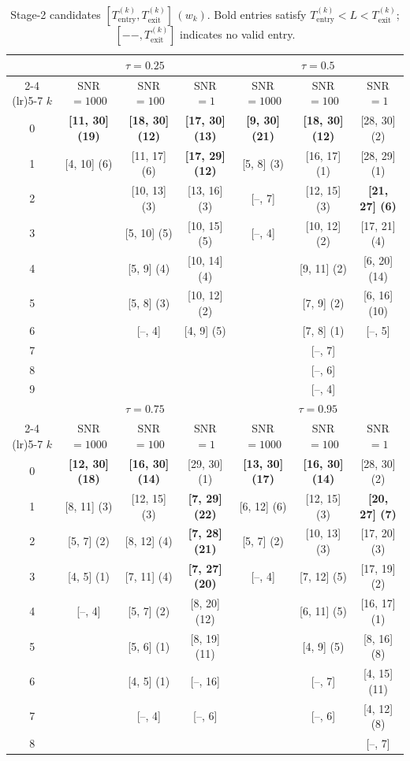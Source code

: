 \begin{table}[htbp]
\centering
\setlength{\tabcolsep}{5pt}
\renewcommand{\arraystretch}{1.15}
\caption{Stage-2 candidates $[T_{\mathrm{entry}}^{(k)}, T_{\mathrm{exit}}^{(k)}]\,(w_k)$. Bold entries satisfy $T_{\mathrm{entry}}^{(k)} < L < T_{\mathrm{exit}}^{(k)}$; $[--, T_{\mathrm{exit}}^{(k)}]$ indicates no valid entry.}
\label{tab:simulation_all_candidates}
\begin{tabular}{ccccccc}
\toprule
 & \multicolumn{3}{c}{$\tau = 0.25$} & \multicolumn{3}{c}{$\tau = 0.5$} \\
\cmidrule(lr){2-4} \cmidrule(lr){5-7}
$k$ & SNR $= 1000$ & SNR $= 100$ & SNR $= 1$ & SNR $= 1000$ & SNR $= 100$ & SNR $= 1$ \\
\midrule
0 & \textbf{[11, 30] (19)} & \textbf{[18, 30] (12)} & \textbf{[17, 30] (13)} & \textbf{[9, 30] (21)} & \textbf{[18, 30] (12)} & [28, 30] (2) \\
1 & [4, 10] (6) & [11, 17] (6) & \textbf{[17, 29] (12)} & [5, 8] (3) & [16, 17] (1) & [28, 29] (1) \\
2 &  & [10, 13] (3) & [13, 16] (3) & [--, 7] & [12, 15] (3) & \textbf{[21, 27] (6)} \\
3 &  & [5, 10] (5) & [10, 15] (5) & [--, 4] & [10, 12] (2) & [17, 21] (4) \\
4 &  & [5, 9] (4) & [10, 14] (4) &  & [9, 11] (2) & [6, 20] (14) \\
5 &  & [5, 8] (3) & [10, 12] (2) &  & [7, 9] (2) & [6, 16] (10) \\
6 &  & [--, 4] & [4, 9] (5) &  & [7, 8] (1) & [--, 5] \\
7 &  &  &  &  & [--, 7] &  \\
8 &  &  &  &  & [--, 6] &  \\
9 &  &  &  &  & [--, 4] &  \\
\midrule
 & \multicolumn{3}{c}{$\tau = 0.75$} & \multicolumn{3}{c}{$\tau = 0.95$} \\
\cmidrule(lr){2-4} \cmidrule(lr){5-7}
$k$ & SNR $= 1000$ & SNR $= 100$ & SNR $= 1$ & SNR $= 1000$ & SNR $= 100$ & SNR $= 1$ \\
\midrule
0 & \textbf{[12, 30] (18)} & \textbf{[16, 30] (14)} & [29, 30] (1) & \textbf{[13, 30] (17)} & \textbf{[16, 30] (14)} & [28, 30] (2) \\
1 & [8, 11] (3) & [12, 15] (3) & \textbf{[7, 29] (22)} & [6, 12] (6) & [12, 15] (3) & \textbf{[20, 27] (7)} \\
2 & [5, 7] (2) & [8, 12] (4) & \textbf{[7, 28] (21)} & [5, 7] (2) & [10, 13] (3) & [17, 20] (3) \\
3 & [4, 5] (1) & [7, 11] (4) & \textbf{[7, 27] (20)} & [--, 4] & [7, 12] (5) & [17, 19] (2) \\
4 & [--, 4] & [5, 7] (2) & [8, 20] (12) &  & [6, 11] (5) & [16, 17] (1) \\
5 &  & [5, 6] (1) & [8, 19] (11) &  & [4, 9] (5) & [8, 16] (8) \\
6 &  & [4, 5] (1) & [--, 16] &  & [--, 7] & [4, 15] (11) \\
7 &  & [--, 4] & [--, 6] &  & [--, 6] & [4, 12] (8) \\
8 &  &  &  &  &  & [--, 7] \\
\bottomrule
\end{tabular}
\end{table}
